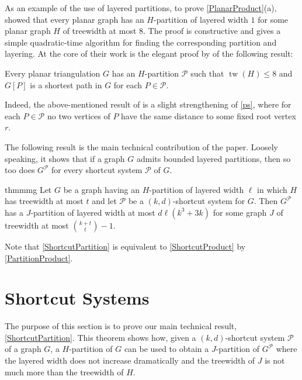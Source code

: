 \documentclass{patmorin}
\DeclareMathOperator{\tw}{tw}
\newcommand{\PP}{\mathcal{P}}
\renewcommand{\leq}{\leqslant}
\begin{document}
As an example of the use of layered partitions, to prove \cref{PlanarProduct}(a), 
\citet{dujmovic.joret.ea:planar} showed that every planar graph has an $H$-partition of layered width $1$ for some planar graph $H$ of treewidth at most $8$. The proof is constructive and gives a simple quadratic-time algorithm for finding the corresponding partition and layering.
At the core of their work is the elegant proof by \citet{pilipczuk.siebertz:polynomial-soda} of the following result:

\begin{thm}
\label{ps}
Every planar triangulation $G$ has an $H$-partition $\mathcal{P}$
such that $\tw(H)\leq 8$ and $G[P]$ is a shortest path in $G$ for each $P\in\mathcal{P}$.
\end{thm}

Indeed, the above-mentioned result of \citet{dujmovic.joret.ea:planar} is a slight strengthening of \cref{ps}, where for each $P\in\mathcal{P}$ no two vertices of $P$ have the same distance to some fixed root vertex $r$.

The following result is the main technical contribution of the paper. Loosely speaking, it shows that if a graph $G$ admits bounded layered partitions, then so too does $G^\PP$ for every shortcut system $\PP$ of $G$.

\begin{restatable}{thm}{mmg}
	\label{ShortcutPartition}
	Let $G$ be a graph having an $H$-partition of layered width $\ell$ in which $H$ has treewidth at most $t$ and let $\PP$ be a $(k,d)$-shortcut system for $G$.  Then $G^\PP$ has a $J$-partition of layered width at most $d\ell(k^3+3k)$ for some graph $J$ of treewidth at most $\binom{k+t}{t}-1$.
\end{restatable}

Note that \cref{ShortcutPartition} is equivalent to \cref{ShortcutProduct} by \cref{PartitionProduct}.



\section{Shortcut Systems}
\label{Structure}

The purpose of this section is to prove our main technical result, \cref{ShortcutPartition}. This theorem shows how, given a $(k,d)$-shortcut system $\mathcal{P}$ of a graph $G$, a $H$-partition of $G$ can be used to obtain a $J$-partition of $G^{\mathcal{P}}$ where the layered width  does not increase dramatically and the treewidth of $J$ is not much more than the treewidth of $H$.  
\end{document}
